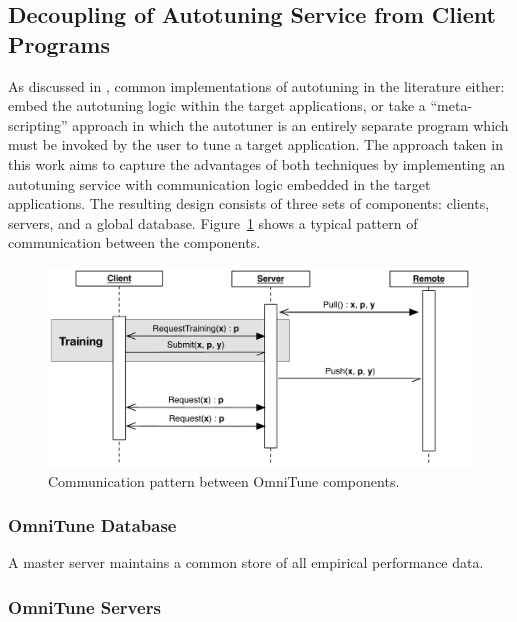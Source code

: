 \subsection{Decoupling of Autotuning Service from Client Programs}

As discussed in , common implementations of
autotuning in the literature either: embed the autotuning logic within
the target applications, or take a ``meta-scripting'' approach in
which the autotuner is an entirely separate program which must be
invoked by the user to tune a target application. The approach taken
in this work aims to capture the advantages of both techniques by
implementing an autotuning service with communication logic embedded
in the target applications. The resulting design consists of three
sets of components: clients, servers, and a global
database. Figure~\ref{fig:omnitune-comms} shows a typical pattern of
communication between the components.

\begin{figure}
\centering
\includegraphics[width=.8\textwidth]{img/omnitune-comms}
\caption{%
  Communication pattern between OmniTune components.%
}
\label{fig:omnitune-comms}
\end{figure}



\subsubsection{OmniTune Database}

A master server maintains a common store of all empirical performance
data. 


\subsubsection{OmniTune Servers}

